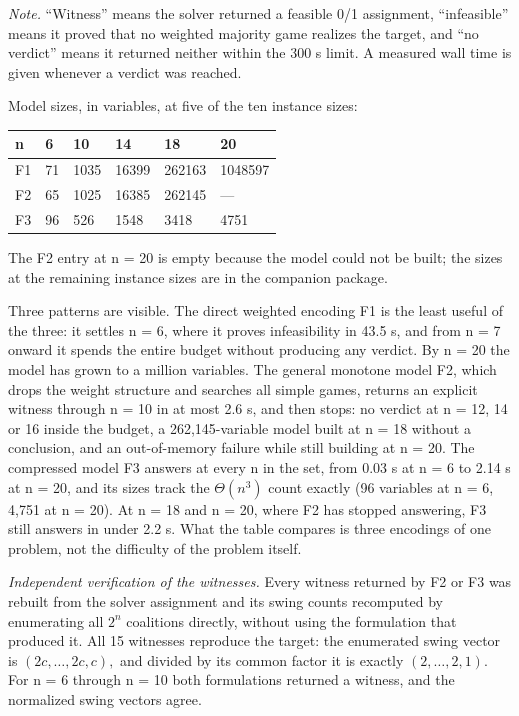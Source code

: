 \documentclass[
]{article}
\newcounter{none} %
\begin{document}
\emph{Note.} ``Witness'' means the solver returned a feasible 0/1
assignment, ``infeasible'' means it proved that no weighted majority
game realizes the target, and ``no verdict'' means it returned neither
within the 300 s limit. A measured wall time is given whenever a verdict
was reached.

Model sizes, in variables, at five of the ten instance sizes:

{\def\LTcaptype{none} %
\begin{longtable}[]{@{}llllll@{}}
\toprule\noalign{}
n & 6 & 10 & 14 & 18 & 20 \\
\midrule\noalign{}
\endhead
\bottomrule\noalign{}
\endlastfoot
F1 & 71 & 1035 & 16399 & 262163 & 1048597 \\
F2 & 65 & 1025 & 16385 & 262145 & --- \\
F3 & 96 & 526 & 1548 & 3418 & 4751 \\
\end{longtable}
}

The F2 entry at n = 20 is empty because the model could not be built;
the sizes at the remaining instance sizes are in the companion package.

Three patterns are visible. The direct weighted encoding F1 is the least
useful of the three: it settles n = 6, where it proves infeasibility in
43.5 s, and from n = 7 onward it spends the entire budget without
producing any verdict. By n = 20 the model has grown to a million
variables. The general monotone model F2, which drops the weight
structure and searches all simple games, returns an explicit witness
through n = 10 in at most 2.6 s, and then stops: no verdict at n = 12,
14 or 16 inside the budget, a 262,145-variable model built at n = 18
without a conclusion, and an out-of-memory failure while still building
at n = 20. The compressed model F3 answers at every n in the set, from
0.03 s at n = 6 to 2.14 s at n = 20, and its sizes track the
\(\Theta(n^3)\) count exactly (96 variables at n = 6, 4,751 at n = 20).
At n = 18 and n = 20, where F2 has stopped answering, F3 still answers
in under 2.2 s. What the table compares is three encodings of one
problem, not the difficulty of the problem itself.

\emph{Independent verification of the witnesses.} Every witness returned
by F2 or F3 was rebuilt from the solver assignment and its swing counts
recomputed by enumerating all \(2^n\) coalitions directly, without using
the formulation that produced it. All 15 witnesses reproduce the target:
the enumerated swing vector is \((2c,\dots,2c,c),\) and divided by its
common factor it is exactly \((2,\dots,2,1).\) For n = 6 through n = 10
both formulations returned a witness, and the normalized swing vectors
agree.
\end{document}
